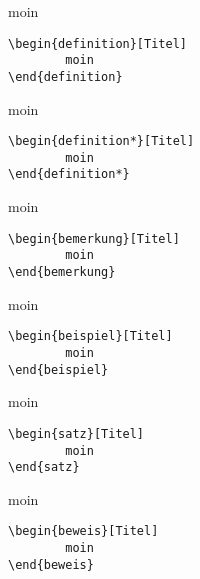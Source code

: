 {\begin{multicols}{2}
\begingroup\begin{definition}[Titel]
moin
\begin{lstlisting}[language=lLatex]
\begin{definition}[Titel]
        moin
\end{definition}\end{lstlisting}
\end{definition}\endgroup

\begingroup\begin{definition*}[Titel]
moin
\begin{lstlisting}[language=lLatex]
\begin{definition*}[Titel]
        moin
\end{definition*}\end{lstlisting}
\end{definition*}\endgroup

\begingroup\begin{bemerkung}[Titel]
moin
\begin{lstlisting}[language=lLatex]
\begin{bemerkung}[Titel]
        moin
\end{bemerkung}\end{lstlisting}
\end{bemerkung}\endgroup

\begingroup\begin{beispiel}[Titel]
moin
\begin{lstlisting}[language=lLatex]
\begin{beispiel}[Titel]
        moin
\end{beispiel}\end{lstlisting}
\end{beispiel}\endgroup

\begingroup\begin{satz}[Titel]
moin
\begin{lstlisting}[language=lLatex]
\begin{satz}[Titel]
        moin
\end{satz}\end{lstlisting}
\end{satz}\endgroup

\columnbreak

\begingroup\begin{beweis}[Titel]
moin
\begin{lstlisting}[language=lLatex]
\begin{beweis}[Titel]
        moin
\end{beweis}\end{lstlisting}
\end{beweis}\endgroup


\end{multicols}}
